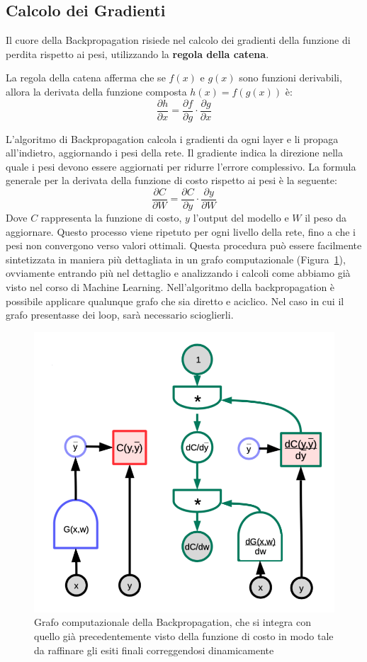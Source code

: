 \subsection{Calcolo dei Gradienti}
Il cuore della Backpropagation risiede nel calcolo dei gradienti della funzione di perdita rispetto ai pesi, utilizzando la \textbf{regola della catena}.
\begin{Definizione}
    La regola della catena afferma che se $f(x)$ e $g(x)$ sono funzioni derivabili, allora la derivata della funzione composta $h(x) = f(g(x))$ è:
    \[
    \frac{\partial h}{\partial x} = \frac{\partial f}{\partial g} \cdot \frac{\partial g}{\partial x}
    \]
\end{Definizione}
L'algoritmo di Backpropagation calcola i gradienti da ogni layer e li propaga all'indietro, aggiornando i pesi della rete. Il gradiente indica la direzione nella quale i pesi devono essere aggiornati per ridurre l'errore complessivo. La formula generale per la derivata della funzione di costo rispetto ai pesi è la seguente:
\begin{equation}
    \frac{\partial C}{\partial W} = \frac{\partial C}{\partial y} \cdot \frac{\partial y}{\partial W}
\end{equation}
Dove $C$ rappresenta la funzione di costo, $y$ l'output del modello e $W$ il peso da aggiornare. Questo processo viene ripetuto per ogni livello della rete, fino a che i pesi non convergono verso valori ottimali. Questa procedura può essere facilmente sintetizzata in maniera più dettagliata in un grafo computazionale (Figura~\ref{fig:backPropGraph}), ovviamente entrando più nel dettaglio e analizzando i calcoli come abbiamo già visto nel corso di Machine Learning. Nell'algoritmo della backpropagation è possibile applicare qualunque grafo che sia diretto e aciclico. Nel caso in cui il grafo presentasse dei loop, sarà necessario scioglierli.

\begin{figure}
    \centering
    \includegraphics[width=0.5\linewidth]{figure/BackPropGraph.png}
    \caption{Grafo computazionale della Backpropagation, che si integra con quello già precedentemente visto della funzione di costo in modo tale da raffinare gli esiti finali correggendosi dinamicamente}
    \label{fig:backPropGraph}
\end{figure}

